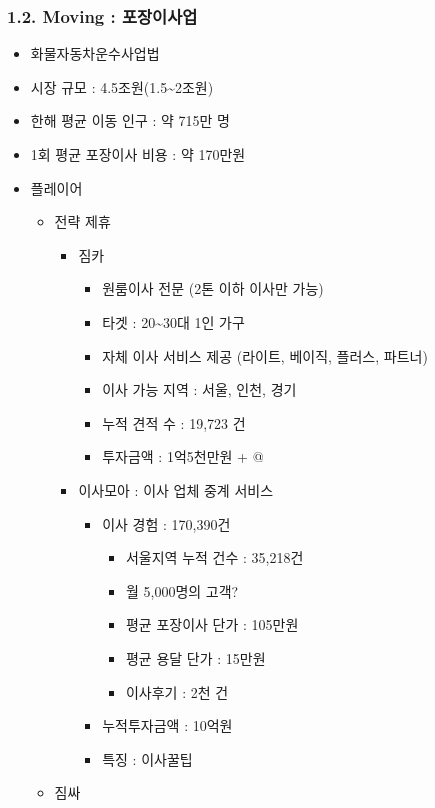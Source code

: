 \documentclass[11pt]{article}
\providecommand{\tightlist}{%
      \setlength{\itemsep}{0pt}\setlength{\parskip}{0pt}}
\begin{document}
\hypertarget{moving-uxd3ecuxc7a5uxc774uxc0acuxc5c5}{%
\subsubsection{1.2. Moving :
포장이사업}\label{moving-uxd3ecuxc7a5uxc774uxc0acuxc5c5}}

\begin{itemize}
\tightlist
\item
  화물자동차운수사업법
\item
  시장 규모 : 4.5조원(1.5\textasciitilde{}2조원)
\item
  한해 평균 이동 인구 : 약 715만 명
\item
  1회 평균 포장이사 비용 : 약 170만원
\item
  플레이어

  \begin{itemize}
  \tightlist
  \item
    전략 제휴

    \begin{itemize}
    \tightlist
    \item
      짐카

      \begin{itemize}
      \tightlist
      \item
        원룸이사 전문 (2톤 이하 이사만 가능)
      \item
        타겟 : 20\textasciitilde{}30대 1인 가구
      \item
        자체 이사 서비스 제공 (라이트, 베이직, 플러스, 파트너)
      \item
        이사 가능 지역 : 서울, 인천, 경기
      \item
        누적 견적 수 : 19,723 건
      \item
        투자금액 : 1억5천만원 + @
      \end{itemize}
    \item
      이사모아 : 이사 업체 중계 서비스

      \begin{itemize}
      \tightlist
      \item
        이사 경험 : 170,390건

        \begin{itemize}
        \tightlist
        \item
          서울지역 누적 건수 : 35,218건
        \item
          월 5,000명의 고객?
        \item
          평균 포장이사 단가 : 105만원
        \item
          평균 용달 단가 : 15만원
        \item
          이사후기 : 2천 건
        \end{itemize}
      \item
        누적투자금액 : 10억원
      \item
        특징 : 이사꿀팁
      \end{itemize}
    \end{itemize}
  \item
    짐싸


\end{itemize}
\end{itemize}
\end{document}
